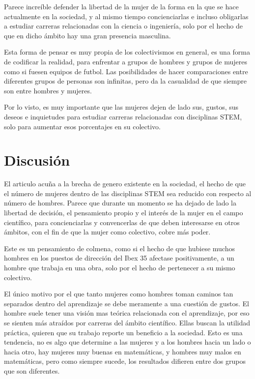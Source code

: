 Parece increíble defender la libertad de la mujer de la forma en la que se hace actualmente en la sociedad, 
y al mismo tiempo concienciarlas e incluso obligarlas a estudiar carreras relacionadas con la ciencia o ingeniería,
solo por el hecho de que en dicho ámbito hay una gran presencia masculina. 

Esta forma de pensar es muy propia de los colectivismos en general, es una forma de codificar la realidad, para 
enfrentar a grupos de hombres y grupos de mujeres como si fuesen equipos de futbol. Las posibilidades de hacer 
comparaciones entre diferentes grupos de personas son infinitas, pero da la casualidad de que siempre son entre 
hombres y mujeres. 

Por lo visto, es muy importante que las mujeres dejen de lado sus, gustos, sus deseos e inquietudes para estudiar 
carreras relacionadas con disciplinas STEM, solo para aumentar esos porcentajes en su colectivo.

\section{Discusión}
\label{sec:discusion}

El articulo acuña a la brecha de genero existente en la sociedad, el hecho de que el número de mujeres dentro de las 
disciplinas STEM sea reducido con respecto al número de hombres. Parece que durante un momento se ha dejado de 
lado la libertad de decisión, el pensamiento propio y el interés de la mujer en el campo científico, para concienciarlas y 
convencerlas de que deben interesarse en otros ámbitos, con el fin de que la mujer como colectivo, cobre más poder.

Este es un pensamiento de colmena, como si el hecho de que hubiese muchos hombres en los puestos de dirección del 
Ibex 35 afectase positivamente, a un hombre que trabaja en una obra, solo por el hecho de pertenecer a su mismo colectivo.

El único motivo por el que tanto mujeres como hombres toman caminos tan separados dentro del aprendizaje se debe 
meramente a una cuestión de gustos. El hombre suele tener una visión mas teórica relacionada con el aprendizaje, por 
eso se sienten más atraídos por carreras del ámbito científico. Ellas buscan la utilidad práctica, quieren que su trabajo 
reporte un beneficio a la sociedad. Esto es una tendencia, no es algo que determine a las mujeres y a los hombres hacia 
un lado o hacia otro, hay mujeres muy buenas en matemáticas, y hombres muy malos en matemáticas, pero como siempre 
sucede, los resultados difieren entre dos grupos que son diferentes.

